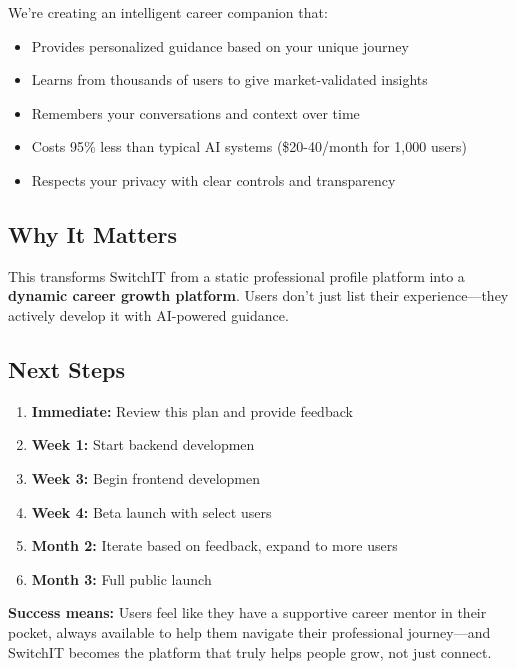 \documentclass[12pt,a4paper]{article}
\begin{document}
We're creating an intelligent career companion that:
\begin{itemize}
  \item Provides personalized guidance based on your unique journey
  \item Learns from thousands of users to give market-validated insights
  \item Remembers your conversations and context over time
  \item Costs 95\% less than typical AI systems (\$20-40/month for 1,000 users)
  \item Respects your privacy with clear controls and transparency
\end{itemize}

\subsection{Why It Matters}

This transforms SwitchIT from a static professional profile platform into a \textbf{dynamic career growth platform}. Users don't just list their experience—they actively develop it with AI-powered guidance.

\subsection{Next Steps}

\begin{enumerate}
  \item \textbf{Immediate:} Review this plan and provide feedback
  \item \textbf{Week 1:} Start backend developmen
  \item \textbf{Week 3:} Begin frontend developmen
  \item \textbf{Week 4:} Beta launch with select users
  \item \textbf{Month 2:} Iterate based on feedback, expand to more users
  \item \textbf{Month 3:} Full public launch
\end{enumerate}

\begin{keypoint}
\textbf{Success means:} Users feel like they have a supportive career mentor in their pocket, always available to help them navigate their professional journey—and SwitchIT becomes the platform that truly helps people grow, not just connect.
\end{keypoint}
\end{document}
